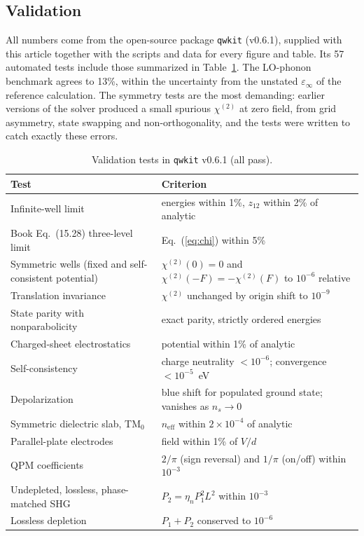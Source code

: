 \documentclass[11pt]{article}
\newcommand{\chitwo}{\chi^{(2)}}
\begin{document}
\subsection{Validation}
All numbers come from the open-source package \texttt{qwkit} (v0.6.1), supplied with this article together with the scripts and data for every figure and table. Its 57 automated tests include those summarized in Table~\ref{tab:validation}. The LO-phonon benchmark agrees to 13\%, within the uncertainty from the unstated $\varepsilon_\infty$ of the reference calculation. The symmetry tests are the most demanding: earlier versions of the solver produced a small spurious $\chitwo$ at zero field, from grid asymmetry, state swapping and non-orthogonality, and the tests were written to catch exactly these errors.

\begin{table}[t]
\centering\small
\caption{Validation tests in \texttt{qwkit} v0.6.1 (all pass).}\label{tab:validation}
\begin{tabular}{@{}ll@{}}
\toprule
Test & Criterion \\ \midrule
Infinite-well limit & energies within 1\%, $z_{12}$ within 2\% of analytic \\
Book Eq.~(15.28) three-level limit & Eq.~(\ref{eq:chi}) within 5\% \\
Symmetric wells (fixed and self-consistent potential) & $\chitwo(0)=0$ and $\chitwo(-F)=-\chitwo(F)$ to $10^{-6}$ relative \\
Translation invariance & $\chitwo$ unchanged by origin shift to $10^{-9}$ \\
State parity with nonparabolicity & exact parity, strictly ordered energies \\
Charged-sheet electrostatics & potential within 1\% of analytic \\
Self-consistency & charge neutrality $<10^{-6}$; convergence $<10^{-5}$~eV \\
Depolarization & blue shift for populated ground state; vanishes as $n_s\to0$ \\
Symmetric dielectric slab, TM$_0$ & $n_\mathrm{eff}$ within $2\times10^{-4}$ of analytic \\
Parallel-plate electrodes & field within 1\% of $V/d$ \\
QPM coefficients & $2/\pi$ (sign reversal) and $1/\pi$ (on/off) within $10^{-3}$ \\
Undepleted, lossless, phase-matched SHG & $P_2=\eta_nP_1^2L^2$ within $10^{-3}$ \\
Lossless depletion & $P_1+P_2$ conserved to $10^{-6}$ \\

\end{tabular}
\end{table}
\end{document}

